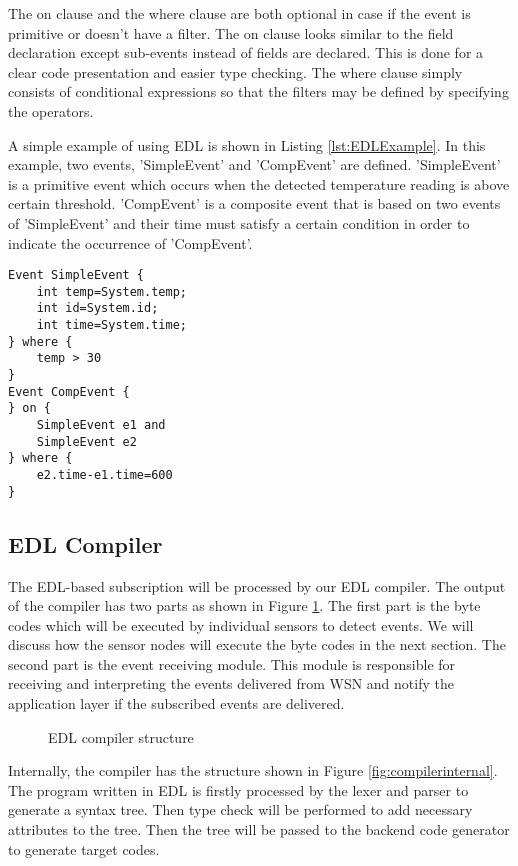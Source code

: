 The on clause and the where clause are both optional in case if the event is primitive or doesn't have a filter. The on clause looks similar to the field declaration except sub-events instead of fields are declared. This is done for a clear code presentation and easier type checking. The where clause simply consists of conditional expressions so that the filters may be defined by specifying the operators.

A simple example of using EDL is shown in Listing \ref{lst:EDLExample}. In this example, two events, 'SimpleEvent' and 'CompEvent' are defined. 'SimpleEvent' is a primitive event which occurs when the detected temperature reading is above certain threshold. 'CompEvent' is a composite event that is based on two events of 'SimpleEvent' and their time must satisfy a certain condition in order to indicate the occurrence of 'CompEvent'.
\begin{lstlisting}[caption=A simple EDL program, label=lst:EDLExample]
Event SimpleEvent {
	int temp=System.temp;
	int id=System.id;
	int time=System.time;
} where {
	temp > 30
}
Event CompEvent {
} on {
	SimpleEvent e1 and
	SimpleEvent e2
} where {
	e2.time-e1.time=600
}
\end{lstlisting}

\subsection{EDL Compiler}
The EDL-based subscription will be processed by our EDL compiler. The output of the compiler has two parts as shown in Figure \ref{fig:edlcompiler}. The first part is the byte codes which will be executed by individual sensors to detect events. We will discuss how the sensor nodes will execute the byte codes in the next section. The second part is the event receiving module. This module is responsible for receiving and interpreting the events delivered from WSN and notify the application layer if the subscribed events are delivered.

\begin{figure}
\centering
{}
\caption{EDL compiler structure}
\label{fig:edlcompiler}
\end{figure}

Internally, the compiler has the structure shown in Figure \ref{fig:compilerinternal}. The program written in EDL is firstly processed by the lexer and parser to generate a syntax tree. Then type check will be performed to add necessary attributes to the tree. Then the tree will be passed to the backend code generator to generate target codes.

